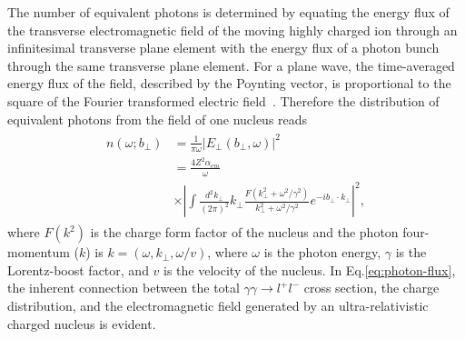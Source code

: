 \documentclass[12pt,epjc3]{svjour3}\sloppy
\begin{document}
The number of equivalent photons is determined by equating the energy flux of the transverse electromagnetic field of the moving highly charged ion through an infinitesimal transverse plane element with the energy flux of a photon bunch through the same transverse plane element. For a plane wave, the time-averaged energy flux of the field, described by the Poynting vector, is proportional to the square of the Fourier transformed electric field~\cite{jacksonClassicalElectrodynamics1975}. Therefore the distribution of equivalent photons from the field of one nucleus reads 
\begin{align}
    \begin{split}
    n(\omega; b_\perp) & = \frac{1}{\pi\omega}|E_\perp(b_\perp, \omega)|^2 \\
    & = \frac{4Z^2\alpha_{em}}{\omega} \\
    & \times \left| \int \frac{d^2k_\perp}{(2\pi)^2} k_\perp \frac{F(k^2_\perp +\omega^2/\gamma^2)}{k^2_\perp +\omega^2/\gamma^2} e^{-i b_\perp \cdot k_\perp}  \right|^2,
    \end{split}
    \label{eq:photon-flux}
\end{align}
where $F(k^2)$ is the charge form factor of the nucleus and the photon four-momentum ($k$) is $k = (\omega, k_\perp, \omega/v )$, where $\omega$ is the photon energy, $\gamma$ is the Lorentz-boost factor, and $v$ is the velocity of the nucleus.
In Eq.\ref{eq:photon-flux}, the inherent connection between the total $\gamma\gamma \rightarrow l^+l^-$ cross section, the charge distribution, and the electromagnetic field generated by an ultra-relativistic charged nucleus is evident.
\end{document}
